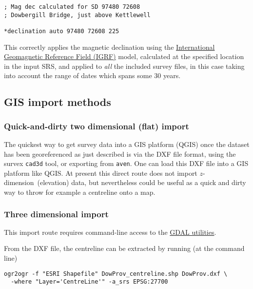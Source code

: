 \documentclass[]{article}
\newcommand{\zdimension}{$z$-dimension}
\begin{document}
\begin{verbatim}
; Mag dec calculated for SD 97480 72608
; Dowbergill Bridge, just above Kettlewell

*declination auto 97480 72608 225
\end{verbatim}

This correctly applies the magnetic declination using the
\href{https://en.wikipedia.org/wiki/International_Geomagnetic_Reference_Field}{International
Geomagnetic Reference Field (IGRF)} model, calculated at the specified
location in the input SRS, and applied to \emph{all} the included survey
files, in this case taking into account the range of dates which spans
some 30 years.

\subsection{GIS import methods}\label{gis-import-methods}

\subsubsection{Quick-and-dirty two dimensional (flat)
import}\label{quick-and-dirty-two-dimensional-flat-import}

The quickest way to get survey data into a GIS platform (QGIS) once the
dataset has been georeferenced as just described is via the DXF file
format, using the survex \verb}cad3d} tool, or exporting from
\verb}aven}. One can load this DXF file into a GIS platform like QGIS.
At present this direct route does not import \zdimension\ (elevation)
data, but nevertheless could be useful as a quick and dirty way to throw
for example a centreline onto a map.

\subsubsection{Three dimensional import}\label{three-dimensional-import}

This import route requires command-line access to the
\href{http://www.gdal.org/ogr_utilities.html}{GDAL utilities}.

From the DXF file, the centreline can be extracted by running (at the
command line)

\begin{verbatim}
ogr2ogr -f "ESRI Shapefile" DowProv_centreline.shp DowProv.dxf \
  -where "Layer='CentreLine'" -a_srs EPSG:27700
\end{verbatim}
\end{document}
